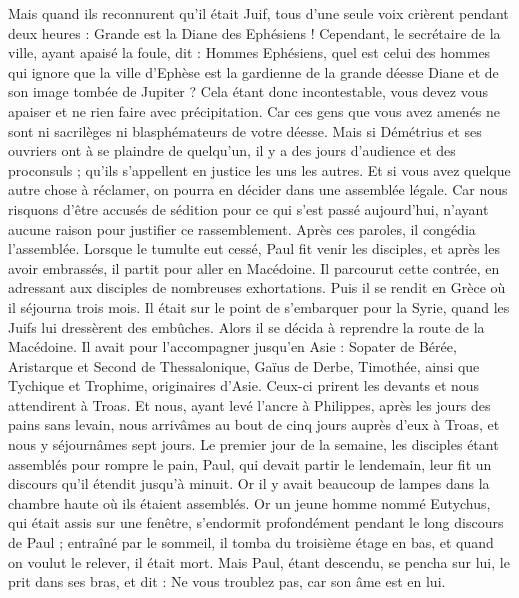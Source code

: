 \begin{multicols}{2}
Mais quand ils reconnurent qu'il était Juif, tous d'une seule voix crièrent pendant deux heures : Grande est la Diane des Ephésiens !
Cependant, le secrétaire de la ville, ayant apaisé la foule, dit : Hommes Ephésiens, quel est celui des hommes qui ignore que la ville d'Ephèse est la gardienne de la grande déesse Diane et de son image tombée de Jupiter ?
Cela étant donc incontestable, vous devez vous apaiser et ne rien faire avec précipitation.
Car ces gens que vous avez amenés ne sont ni sacrilèges ni blasphémateurs de votre déesse.
Mais si Démétrius et ses ouvriers ont à se plaindre de quelqu'un, il y a des jours d'audience et des proconsuls ; qu'ils s'appellent en justice les uns les autres.
Et si vous avez quelque autre chose à réclamer, on pourra en décider dans une assemblée légale.
Car nous risquons d'être accusés de sédition pour ce qui s'est passé aujourd'hui, n'ayant aucune raison pour justifier ce rassemblement. Après ces paroles, il congédia l'assemblée.
\VerseOne{}Lorsque le tumulte eut cessé, Paul fit venir les disciples, et après les avoir embrassés, il partit pour aller en Macédoine.
Il parcourut cette contrée, en adressant aux disciples de nombreuses exhortations.
Puis il se rendit en Grèce où il séjourna trois mois. Il était sur le point de s'embarquer pour la Syrie, quand les Juifs lui dressèrent des embûches. Alors il se décida à reprendre la route de la Macédoine.
Il avait pour l'accompagner jusqu'en Asie : Sopater de Bérée, Aristarque et Second de Thessalonique, Gaïus de Derbe, Timothée, ainsi que Tychique et Trophime, originaires d'Asie.
Ceux-ci prirent les devants et nous attendirent à Troas.
Et nous, ayant levé l'ancre à Philippes, après les jours des pains sans levain, nous arrivâmes au bout de cinq jours auprès d'eux à Troas, et nous y séjournâmes sept jours.
Le premier jour de la semaine, les disciples étant assemblés pour rompre le pain, Paul, qui devait partir le lendemain, leur fit un discours qu'il étendit jusqu'à minuit.
Or il y avait beaucoup de lampes dans la chambre haute où ils étaient assemblés.
Or un jeune homme nommé Eutychus, qui était assis sur une fenêtre, s'endormit profondément pendant le long discours de Paul ; entraîné par le sommeil, il tomba du troisième étage en bas, et quand on voulut le relever, il était mort.
Mais Paul, étant descendu, se pencha sur lui, le prit dans ses bras, et dit : Ne vous troublez pas, car son âme est en lui.

\end{multicols}
